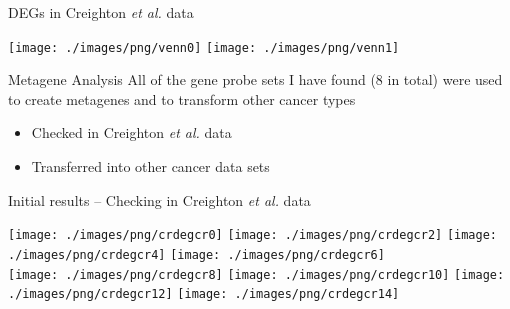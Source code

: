 \documentclass[handout]{beamer}
\begin{document}

\begin{frame}{DEGs in Creighton \textit{et al.} data}
	\begin{center}
		\texttt{[image: ./images/png/venn0]}
		\texttt{[image: ./images/png/venn1]}
	\end{center}
\end{frame}

\begin{frame}{Metagene Analysis}
	All of the gene probe sets I have found (8 in total) were used to create metagenes and to transform other cancer types
	\begin{itemize}
		\item Checked in Creighton \textit{et al.} data
		\item Transferred into other cancer data sets
	\end{itemize}
\end{frame}

\begin{frame}{Initial results -- Checking in Creighton \textit{et al.} data}
	\begin{adjustwidth}{-1.5em}{-1.5em}
		\texttt{[image: ./images/png/crdegcr0]}
		\texttt{[image: ./images/png/crdegcr2]}
		\texttt{[image: ./images/png/crdegcr4]}
		\texttt{[image: ./images/png/crdegcr6]}\\
		\texttt{[image: ./images/png/crdegcr8]}
		\texttt{[image: ./images/png/crdegcr10]}
		\texttt{[image: ./images/png/crdegcr12]}
		\texttt{[image: ./images/png/crdegcr14]}
	\end{adjustwidth}
\end{frame}
\end{document}
